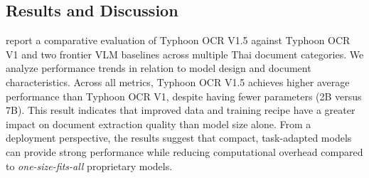 \documentclass[]{typhoon} %
\begin{document}



\subsection{Results and Discussion}

 report a comparative evaluation of Typhoon OCR V1.5 against Typhoon OCR V1 and two frontier VLM baselines across multiple Thai document categories. We analyze performance trends in relation to model design and document characteristics. Across all metrics, Typhoon OCR V1.5 achieves higher average performance than Typhoon OCR V1, despite having fewer parameters (2B versus 7B). This result indicates that improved data and training recipe have a greater impact on document extraction quality than model size alone. From a deployment perspective, the results suggest that compact, task-adapted models can provide strong performance while reducing computational overhead compared to \textit{one-size-fits-all} proprietary models.
\end{document}
